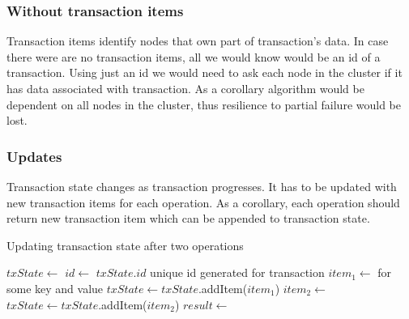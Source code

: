 \subsubsection{Without transaction items}
Transaction items identify nodes that own part of transaction's data. 
In case there were are no transaction items, all we would know would be an id of a transaction.
Using just an id we would need to ask each node in the cluster if it has data associated with transaction. As a corollary algorithm would be dependent on all nodes in the cluster, thus resilience to partial failure would be lost.

\subsubsection{Updates}
Transaction state changes as transaction progresses. It has to be updated with new transaction items for each operation. As a corollary, each operation should return new transaction item which can be appended to transaction state. 





\begin{algorithm}
  \caption{Updating transaction state after two operations}
  \label{alg:updateTxState}
  \begin{algorithmic}  	    
    \State $txState \gets$ 
    \State $id \gets$ $txState.id$ unique id generated for transaction
    \State $item_{1} \gets $  \Comment for some key and value
    \State $txState \gets txState$.addItem($item_{1}$)
    \State $item_{2} \gets $ 
    \State $txState \gets txState$.addItem($item_{2}$)
    \State $result \gets $     
  \end{algorithmic}
\end{algorithm}

